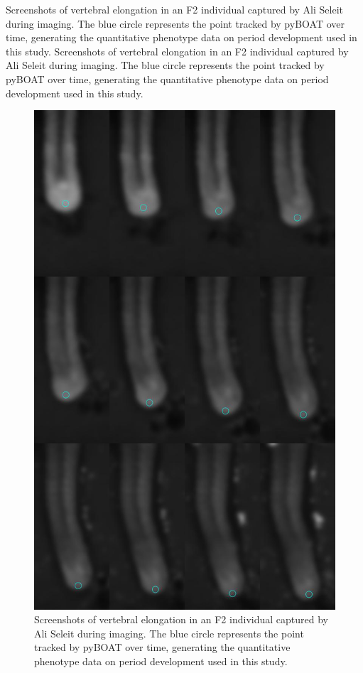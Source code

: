 \documentclass[
]{book}
\begin{document}
Screenshots of vertebral elongation in an F2 individual captured by Ali Seleit during imaging. The blue circle represents the point tracked by pyBOAT over time, generating the quantitative phenotype data on period development used in this study. Screenshots of vertebral elongation in an F2 individual captured by Ali Seleit during imaging. The blue circle represents the point tracked by pyBOAT over time, generating the quantitative phenotype data on period development used in this study.

\begin{figure}
\includegraphics[width=1\linewidth]{figs/somites/ali_compiled_somite_elong} \caption{Screenshots of vertebral elongation in an F2 individual captured by Ali Seleit during imaging. The blue circle represents the point tracked by pyBOAT over time, generating the quantitative phenotype data on period development used in this study.}\label{fig:somite-period-ali}
\end{figure}
\end{document}
